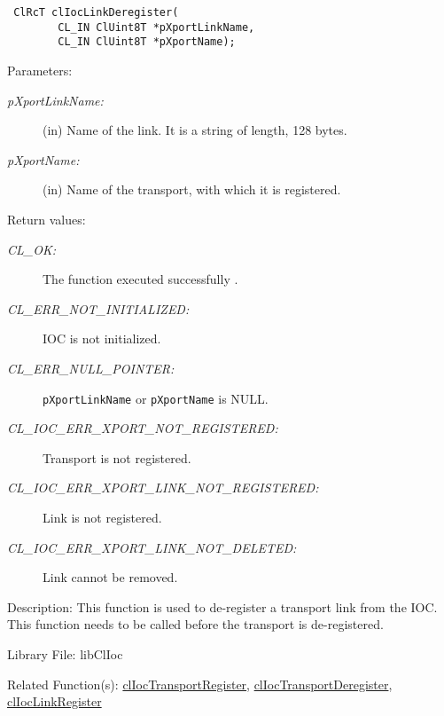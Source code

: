 \begin{flushleft}
\begin{Desc}
\footnotesize\begin{verbatim} ClRcT clIocLinkDeregister(
        CL_IN ClUint8T *pXportLinkName, 
        CL_IN ClUint8T *pXportName);
\end{verbatim}
\normalsize
\end{Desc}
\begin{Desc}
\item[Parameters:]
\begin{description}
\item[{\em p\-Xport\-Link\-Name:}](in) Name of the link. It is a string of length, 128 bytes.
\item[{\em p\-Xport\-Name:}](in) Name of the transport, with which it is registered.\end{description}
\end{Desc}
\begin{Desc}
\item[Return values:]
\begin{description}
\item[{\em CL\_\-OK:}]The function executed successfully . \item[{\em CL\_\-ERR\_\-NOT\_\-INITIALIZED:}] IOC is not initialized. 
\item[{\em CL\_\-ERR\_\-NULL\_\-POINTER:}]{\tt{pXportLinkName}} or {\tt{pXportName}} is NULL. 
\item[{\em CL\_\-IOC\_\-ERR\_\-XPORT\_\-NOT\_\-REGISTERED:}]Transport is not registered. 
\item[{\em CL\_\-IOC\_\-ERR\_\-XPORT\_\-LINK\_\-NOT\_\-REGISTERED:}]Link is not registered. 
\item[{\em CL\_\-IOC\_\-ERR\_\-XPORT\_\-LINK\_\-NOT\_\-DELETED:}]Link cannot be removed.\end{description}
\end{Desc}
\begin{Desc}
\item[Description:]This function is used to de-register a transport link from the IOC. This function needs to be called before the transport is 
de-registered.\end{Desc}
\begin{Desc}
\item[Library File:]libClIoc\end{Desc}
\begin{Desc}
\item[Related Function(s):]\hyperlink{pageioc118}{cl\-Ioc\-Transport\-Register}, \hyperlink{pageioc119}{cl\-Ioc\-Transport\-Deregister},
\hyperlink{pageioc303}{cl\-Ioc\-Link\-Register} \end{Desc}
\newpage




\end{flushleft}
